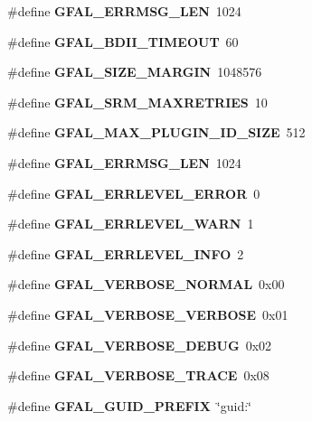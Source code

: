 \begin{CompactItemize}
\item 
\#define \textbf{GFAL\_\-ERRMSG\_\-LEN}~1024\label{gfal__constants_8h_7b40fd79ddf31bad610f516475065a0e}

\item 
\#define \textbf{GFAL\_\-BDII\_\-TIMEOUT}~60\label{gfal__constants_8h_d06bbf92499b345ee7305317ec5c1c1b}

\item 
\#define \textbf{GFAL\_\-SIZE\_\-MARGIN}~1048576\label{gfal__constants_8h_8bebe3d274d63f517a5e875a0588cc62}

\item 
\#define \textbf{GFAL\_\-SRM\_\-MAXRETRIES}~10\label{gfal__constants_8h_65a6aeea7aa08fb785c08770e993137b}

\item 
\#define \textbf{GFAL\_\-MAX\_\-PLUGIN\_\-ID\_\-SIZE}~512\label{gfal__constants_8h_f450a268274116d7f0d21461cd3e8df9}

\item 
\#define \textbf{GFAL\_\-ERRMSG\_\-LEN}~1024\label{gfal__constants_8h_7b40fd79ddf31bad610f516475065a0e}

\item 
\#define \textbf{GFAL\_\-ERRLEVEL\_\-ERROR}~0\label{gfal__constants_8h_6426c0ea17e86ab60e58f0736752880f}

\item 
\#define \textbf{GFAL\_\-ERRLEVEL\_\-WARN}~1\label{gfal__constants_8h_dc3471997c4f262015c3720a605ded41}

\item 
\#define \textbf{GFAL\_\-ERRLEVEL\_\-INFO}~2\label{gfal__constants_8h_7e72d1391c92eee828752e1e6b8102a2}

\item 
\#define \textbf{GFAL\_\-VERBOSE\_\-NORMAL}~0x00\label{gfal__constants_8h_3c3ece79804284cc6966b7773e1db120}

\item 
\#define \textbf{GFAL\_\-VERBOSE\_\-VERBOSE}~0x01\label{gfal__constants_8h_84a32c8a5edeea3b4f38de04ded0969f}

\item 
\#define \textbf{GFAL\_\-VERBOSE\_\-DEBUG}~0x02\label{gfal__constants_8h_bb3df1c6c5b916095e8310fe969e5d67}

\item 
\#define \textbf{GFAL\_\-VERBOSE\_\-TRACE}~0x08\label{gfal__constants_8h_62b3e4b92c6df96f9b0e2dc961dabd5a}

\item 
\#define \textbf{GFAL\_\-GUID\_\-PREFIX}~\char`\"{}guid:\char`\"{}\label{gfal__constants_8h_9adb5dc8efeaa3454b32e2f67309e36f}


\end{CompactItemize}
